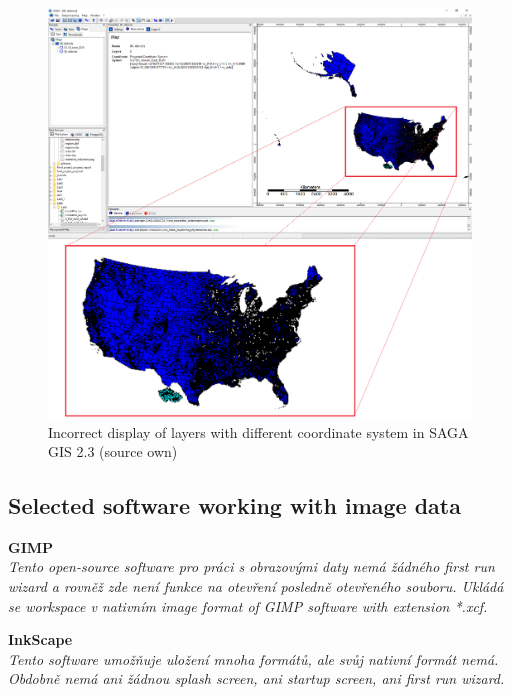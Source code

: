 \documentclass[a4paper,10pt,twoside]{article}
\begin{document}
\vspace{0.3cm}
\begin{figure}[hbt!] 
\begin{center}
\includegraphics[width=15cm]{pictures/saga_gis_cele.png} 
\caption[Incorrect display of layers with different coordinate system in SAGA GIS 2.3 (source own)]{Incorrect display of layers with different coordinate system in SAGA GIS 2.3 (source own)}
\label{fig:saga_gis_cele}
\end{center}
\end{figure}


\subsection{Selected software working with image data}

\noindent \textbf{GIMP} \\

\noindent \textit{\color{red}Tento open-source software pro práci s obrazovými daty nemá žádného first run wizard a rovněž zde není funkce na otevření posledně otevřeného souboru. Ukládá se workspace v nativním image format of GIMP software with extension *.xcf.}

\noindent \textbf{InkScape} \\

\noindent \textit{\color{red}Tento software umožňuje uložení mnoha formátů, ale svůj nativní formát nemá. Obdobně nemá ani žádnou splash screen, ani startup screen, ani first run wizard.}
\end{document}
